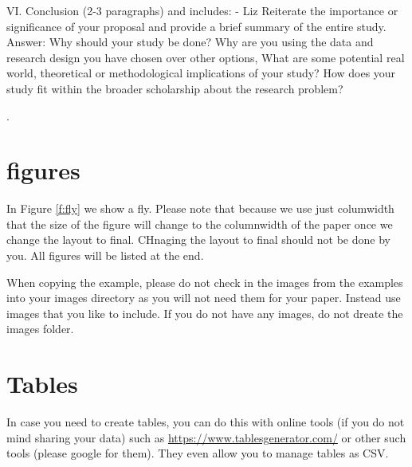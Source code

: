 \documentclass[sigconf]{acmart}
\begin{document}




VI. Conclusion (2-3 paragraphs) and includes: - Liz
Reiterate the importance or significance of your proposal and provide a brief summary of the entire study.
Answer:
Why should your study be done?
Why are you using the data and research design you have chosen over other options,
What are some potential real world, theoretical or methodological implications of your study?
How does your study fit within the broader scholarship about the research problem?








 \cite{editor00}.

\section{figures}

In Figure \ref{f:fly} we show a fly. Please note that because we use
just columwidth that the size of the figure will change to the
columnwidth of the paper once we change the layout to final. CHnaging
the layout to final should not be done by you. All figures will be
listed at the end.


When copying the example, please do not check in the images from the
examples into your images directory as you will not need them for your
paper. Instead use images that you like to include. If you do not have
any images, do not dreate the images folder.

\section{Tables}

In case you need to create tables, you can do this with online tools
(if you do not mind sharing your data) such as
\url{https://www.tablesgenerator.com/} or other such tools (please
google for them). They even allow you to manage tables as CSV.
\end{document}
